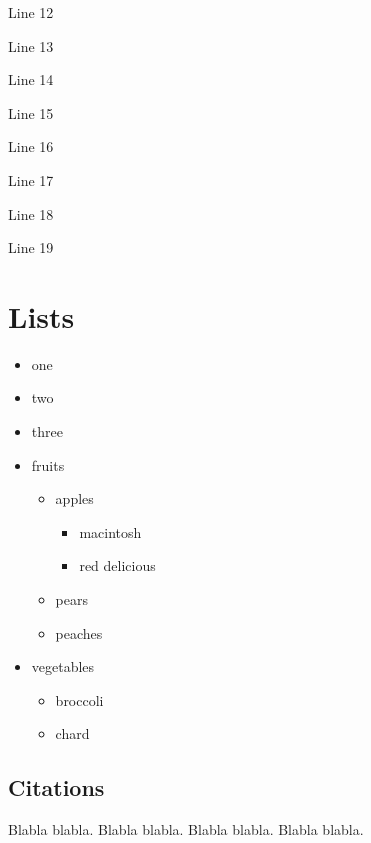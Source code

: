 \documentclass[]{rsos}%
\providecommand{\tightlist}{%
  \setlength{\itemsep}{0pt}\setlength{\parskip}{0pt}}
\begin{document}
Line 12

Line 13

Line 14

Line 15

Line 16

Line 17

Line 18

Line 19

\EndFirstPage

\hypertarget{lists}{%
\section{Lists}\label{lists}}

\begin{itemize}
\item
  one
\item
  two
\item
  three
\item
  fruits

  \begin{itemize}
  \tightlist
  \item
    apples

    \begin{itemize}
    \tightlist
    \item
      macintosh
    \item
      red delicious
    \end{itemize}
  \item
    pears
  \item
    peaches
  \end{itemize}
\item
  vegetables

  \begin{itemize}
  \tightlist
  \item
    broccoli
  \item
    chard
  \end{itemize}
\end{itemize}

\hypertarget{citations}{%
\subsection{Citations}\label{citations}}

Blabla \cite{Lannes} blabla. Blabla \cite{HJ2} blabla. Blabla \cite{BF, Lannes} blabla. Blabla \cite{Benjamin1967, HJ2, HJ3, HP2} blabla.
\end{document}
